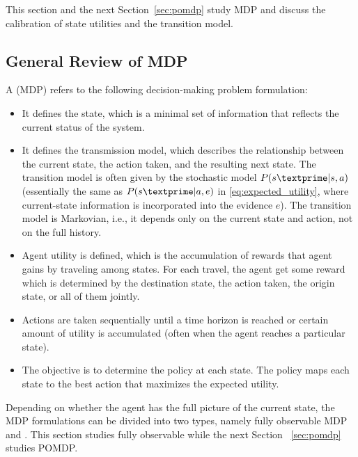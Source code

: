 This section and the next Section~\ref{sec:pomdp} study MDP and discuss the calibration of state utilities and the transition model.

\subsection{General Review of MDP} \label{sec:generalreviewmdp}

A  (MDP) refers to the following decision-making problem formulation:
\begin{itemize}
	\item It defines the state, which is a minimal set of information that reflects the current status of the system. 
	\item It defines the transmission model, which describes the relationship between the current state, the action taken, and the resulting next state. The transition model is often given by the stochastic model $P(s\textprime|s,a)$ (essentially the same as $P(s\textprime|a,e)$ in \eqref{eq:expected_utility}, where current-state information is incorporated into the evidence $e$). The transition model is Markovian, i.e., it depends only on the current state and action, not on the full history.
	\item Agent utility is defined, which is the accumulation of rewards that agent gains by traveling among states. For each travel, the agent get some reward which is determined by the destination state, the action taken, the origin state, or all of them jointly.
	\item Actions are taken sequentially until a time horizon is reached or certain amount of utility is accumulated (often when the agent reaches a particular state).
	\item The objective is to determine the policy at each state. The policy maps each state to the best action that maximizes the expected utility.
\end{itemize}

Depending on whether the agent has the full picture of the current state, the MDP formulations can be divided into two types, namely fully observable MDP and . This section studies fully observable while the next Section ~\ref{sec:pomdp} studies POMDP. 

